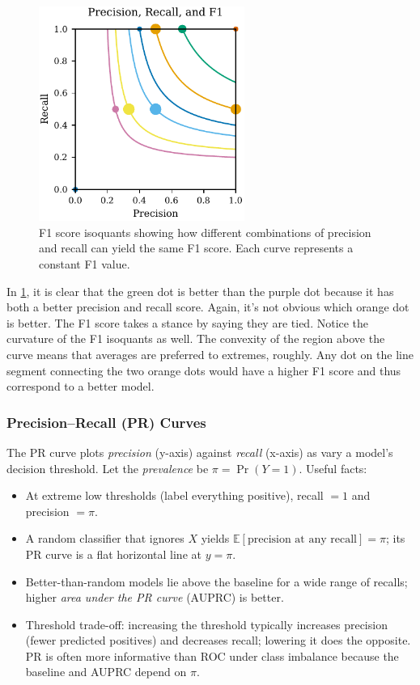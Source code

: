 \begin{figure}[H]
\centering
\includegraphics[width=0.6\textwidth]{images/scatter_precision_recall_f1.pdf}
\caption{F1 score isoquants showing how different combinations of precision and recall can yield the same F1 score. Each curve represents a constant F1 value.}
\label{fig:f1-isoquants}
\end{figure}

In \cref{fig:f1-isoquants}, it is clear that the green dot is better than the purple dot because it has both a better precision and recall score. Again, it's not obvious which orange dot is better. The F1 score takes a stance by saying they are tied. Notice the curvature of the F1 isoquants as well. The convexity of the region above the curve means that averages are preferred to extremes, roughly. Any dot on the line segment connecting the two orange dots would have a higher F1 score and thus correspond to a better model.


\subsubsection{Precision--Recall (PR) Curves}

The PR curve plots \emph{precision} (y-axis) against \emph{recall} (x-axis) as vary a model's decision threshold. Let the \emph{prevalence} be $\pi = \Pr(Y=1)$. Useful facts:
\begin{itemize}
\item At extreme low thresholds (label everything positive), recall $=1$ and precision $=\pi$.
\item A random classifier that ignores $X$ yields $\mathbb{E}[\text{precision at any recall}]=\pi$; its PR curve is a flat horizontal line at $y=\pi$.
\item Better-than-random models lie above the baseline for a wide range of recalls; higher \emph{area under the PR curve} (AUPRC) is better.
\item Threshold trade-off: increasing the threshold typically increases precision (fewer predicted positives) and decreases recall; lowering it does the opposite. PR is often more informative than ROC under class imbalance because the baseline and AUPRC depend on $\pi$.
\end{itemize}


